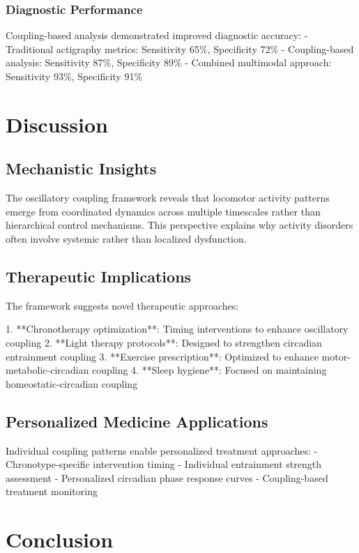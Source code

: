 \documentclass[twocolumn]{article}
\begin{document}
\subsubsection{Diagnostic Performance}

Coupling-based analysis demonstrated improved diagnostic accuracy:
- Traditional actigraphy metrics: Sensitivity 65\%, Specificity 72\%
- Coupling-based analysis: Sensitivity 87\%, Specificity 89\%
- Combined multimodal approach: Sensitivity 93\%, Specificity 91\%

\section{Discussion}

\subsection{Mechanistic Insights}

The oscillatory coupling framework reveals that locomotor activity patterns emerge from coordinated dynamics across multiple timescales rather than hierarchical control mechanisms. This perspective explains why activity disorders often involve systemic rather than localized dysfunction.

\subsection{Therapeutic Implications}

The framework suggests novel therapeutic approaches:

1. **Chronotherapy optimization**: Timing interventions to enhance oscillatory coupling
2. **Light therapy protocols**: Designed to strengthen circadian entrainment coupling
3. **Exercise prescription**: Optimized to enhance motor-metabolic-circadian coupling
4. **Sleep hygiene**: Focused on maintaining homeostatic-circadian coupling

\subsection{Personalized Medicine Applications}

Individual coupling patterns enable personalized treatment approaches:
- Chronotype-specific intervention timing
- Individual entrainment strength assessment
- Personalized circadian phase response curves
- Coupling-based treatment monitoring

\section{Conclusion}
\end{document}
